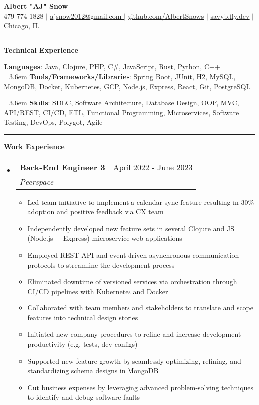 \documentclass[letterpaper,11pt]{article}
\makeatletter
\newcommand{\resumeItem}[1]{
  \item\small{
    {#1 \vspace{-2pt}}
  }
}
\newcommand{\resumeSubheading}[4]{
  \vspace{-2pt}\item
    \begin{tabular*}{0.97\textwidth}[t]{l@{\extracolsep{\fill}}r}
      \textbf{#1} & #2 \\
      \textit{\small#3} & \textit{\small #4} \\
    \end{tabular*}\vspace{0pt}
}
\newcommand{\resumeSubHeadingListStart}{\begin{itemize}[leftmargin=0.15cm, label={}]}
\newcommand{\resumeSubHeadingListEnd}{\end{itemize}}
\newcommand{\resumeItemListStart}{\begin{itemize}}
\newcommand{\resumeItemListEnd}{\end{itemize}\vspace{-5pt}}
\makeatother
\begin{document}
\textbf{\normalshape \Large \textcolor{magic_blue}{Albert "AJ" Snow}} \\ \vspace{3pt}
\small 479-774-1828 $|$ 
\href{ mailto:ajsnow2012@gmail.com }
{\underline{ ajsnow2012@gmail.com }} $|$
\href{https://github.com/AlbertSnows}{\underline{github.com/AlbertSnows}}
$|$ \href{https://savyb.fly.dev/}{\underline{savyb.fly.dev}}
$|$ Chicago, IL
\noindent\rule{19.5cm}{0.4pt}

\textbf{\large \textcolor{magic_blue}{Technical Experience} }

\begin{onehalfspace}
	\textbf{ Languages}{: Java, Clojure, PHP, C\#, JavaScript, Rust, Python, C++ } \\
	\hangindent=3.6em
	\textbf{ Tools/Frameworks/Libraries}{:
		Spring Boot, JUnit, H2, MySQL,
		MongoDB, Docker, Kubernetes, GCP, Node.js,
		Express, React, Git, PostgreSQL } \\
\end{onehalfspace}

\hangindent=3.6em
\textbf{ Skills}{: }
SDLC, Software Architecture, Database Design, 
OOP, MVC, API/REST, CI/CD,
ETL, Functional Programming, Microservices,
Software Testing, DevOps, Polygot, Agile
\noindent\rule{19.5cm}{0.4pt}

\textbf{\large \textcolor{magic_blue}{Work Experience}}
\resumeSubHeadingListStart
\resumeSubheading
{Back-End Engineer 3}{April 2022 - June 2023}
{Peerspace}{}
\resumeItemListStart
\resumeItem{ Led team initiative to implement a calendar sync feature resulting in 30\% adoption and positive feedback via CX team}
\resumeItem{ Independently developed new feature sets in several Clojure and JS (Node.js + Express) microservice web applications}
\resumeItem{ Employed REST API and event-driven asynchronous communication protocols to streamline the development process}
\resumeItem{ Eliminated downtime of versioned services via orchestration through CI/CD pipelines with Kubernetes and Docker }
\resumeItem{ Collaborated with team members and stakeholders to translate and scope features into technical design stories}
\resumeItem{ Initiated new company procedures to refine and increase development productivity (e.g. tests, dev configs)}
\resumeItem{ Supported new feature growth by seamlessly optimizing, refining, and standardizing schema designs in MongoDB}
\resumeItem{ Cut business expenses by leveraging advanced problem-solving techniques to identify and debug software faults}
\resumeItemListEnd
\resumeSubHeadingListEnd
\end{document}
